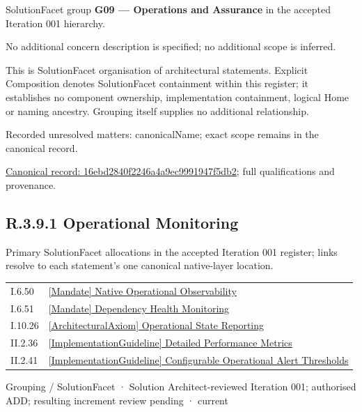 SolutionFacet group \textbf{G09 — Operations and Assurance} in the accepted Iteration 001 hierarchy.



No additional concern description is specified; no additional scope is inferred.



This is SolutionFacet organisation of architectural statements. Explicit Composition denotes SolutionFacet containment within this register; it establishes no component ownership, implementation containment, logical Home or naming ancestry. Grouping itself supplies no additional relationship.


{\small Recorded unresolved matters: canonicalName; exact scope remains in the canonical record.}\par
{\footnotesize \href{../../../../../../../continuum/grouping/16ebd2840f2246a4a9ec9991947f5db2.md}{Canonical record: 16ebd2840f2246a4a9ec9991947f5db2}; full qualifications and provenance.}\par
\subsection*{R.3.9.1 Operational Monitoring}
\label{navigation:R.3.9.1}

Primary SolutionFacet allocations in the accepted Iteration 001 register; links resolve to each statement’s one canonical native-layer location.\par
\begin{longtable}{p{.22\linewidth}p{.73\linewidth}}
I.6.50 & \hyperref[element:151906f8acad4519b7f9204cce9fc758]{[Mandate] Native Operational Observability} \\
I.6.51 & \hyperref[element:c5c8a76fbcbb466bb94f27b4863fb84c]{[Mandate] Dependency Health Monitoring} \\
I.10.26 & \hyperref[element:d7e3f0388d0043259585d1e4c5c948d6]{[ArchitecturalAxiom] Operational State Reporting} \\
II.2.36 & \hyperref[element:247ae4b498944e5f80c638fc958a3f43]{[ImplementationGuideline] Detailed Performance Metrics} \\
II.2.41 & \hyperref[element:587db702f9134c5b8292f894dbcba53d]{[ImplementationGuideline] Configurable Operational Alert Thresholds} \\
\end{longtable}
\label{element:cc0a0cc2678c4c7db20ad015a75cc1de}
{\small Grouping / SolutionFacet · Solution Architect-reviewed Iteration 001; authorised ADD; resulting increment review pending · current}\par

